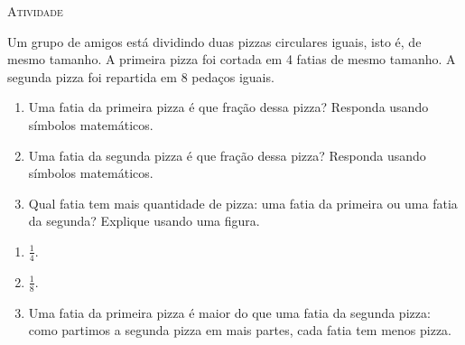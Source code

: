 \documentclass[10 pt,usenames,dvipsnames, oneside]{article}
\begin{document}
\bigskip
\begin{center}
{\large \scshape Atividade}
\end{center}
\fi

Um grupo de amigos está dividindo duas pizzas circulares iguais, isto é, de mesmo tamanho. A primeira pizza foi cortada em 4 fatias de mesmo tamanho. A segunda pizza foi repartida em 8 pedaços iguais.
\begin{enumerate} [label=\alph*)] %
\item Uma fatia da primeira pizza é que fração dessa pizza? Responda usando símbolos matemáticos.
\item Uma fatia da segunda pizza é que fração dessa pizza? Responda usando símbolos matemáticos.
\item Qual fatia tem mais quantidade de pizza: uma fatia da primeira ou uma fatia da segunda? Explique usando uma figura.
\end{enumerate} %

\ifdefined\prof
\clearpage
\begin{solucao}
\begin{multicols}{2}
\begin{enumerate} [label=\alph*)] %
    \item $\frac{1}{4}$.
    \item $\frac{1}{8}$.
    \item Uma fatia da primeira pizza é maior do que uma fatia da segunda pizza: como partimos a segunda pizza em mais partes, cada fatia tem menos pizza.

\end{enumerate} %
\begin{center}
        \quad \quad
\end{center}
\end{multicols}
\end{solucao}
\fi
\end{document}
